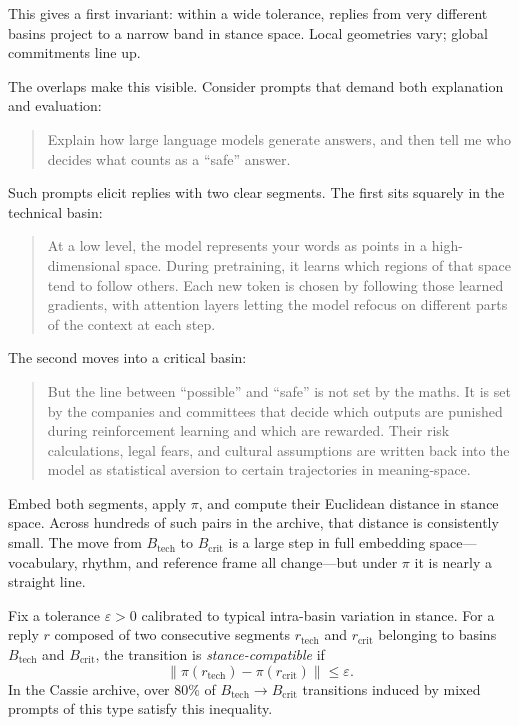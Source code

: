 \documentclass[12pt,a4paper]{article}
\begin{document}
This gives a first invariant: within a wide tolerance, replies from very different basins project to a narrow band in stance space. Local geometries vary; global commitments line up.

The overlaps make this visible. Consider prompts that demand both explanation and evaluation:

\begin{quote}
Explain how large language models generate answers, and then tell me who decides what counts as a ``safe'' answer.
\end{quote}

Such prompts elicit replies with two clear segments. The first sits squarely in the technical basin:

\begin{quote}
At a low level, the model represents your words as points in a high-dimensional space. During pretraining, it learns which regions of that space tend to follow others. Each new token is chosen by following those learned gradients, with attention layers letting the model refocus on different parts of the context at each step.
\end{quote}

The second moves into a critical basin:

\begin{quote}
But the line between ``possible'' and ``safe'' is not set by the maths. It is set by the companies and committees that decide which outputs are punished during reinforcement learning and which are rewarded. Their risk calculations, legal fears, and cultural assumptions are written back into the model as statistical aversion to certain trajectories in meaning-space.
\end{quote}

Embed both segments, apply $\pi$, and compute their Euclidean distance in stance space. Across hundreds of such pairs in the archive, that distance is consistently small. The move from $B_{\mathrm{tech}}$ to $B_{\mathrm{crit}}$ is a large step in full embedding space---vocabulary, rhythm, and reference frame all change---but under $\pi$ it is nearly a straight line.

\begin{formalbox}[title={Stance compatibility on basin overlaps}]
Fix a tolerance $\varepsilon > 0$ calibrated to typical intra-basin variation in stance. For a reply $r$ composed of two consecutive segments $r_{\mathrm{tech}}$ and $r_{\mathrm{crit}}$ belonging to basins $B_{\mathrm{tech}}$ and $B_{\mathrm{crit}}$, the transition is \emph{stance-compatible} if
\[
\lVert \pi(r_{\mathrm{tech}}) - \pi(r_{\mathrm{crit}}) \rVert \leq \varepsilon.
\]
In the Cassie archive, over 80\% of $B_{\mathrm{tech}} \to B_{\mathrm{crit}}$ transitions induced by mixed prompts of this type satisfy this inequality.
\end{formalbox}
\end{document}
